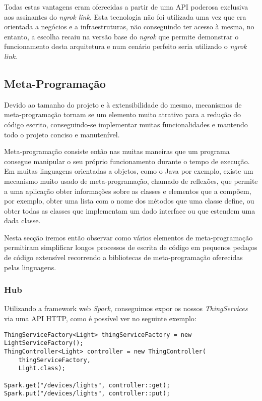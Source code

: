 Todas estas vantagens eram oferecidas a partir de uma API poderosa exclusiva aos assinantes do \textit{ngrok link}. Esta tecnologia não foi utilizada uma vez que era orientada a negócios e a infraestruturas, não conseguindo ter acesso à mesma, no entanto, a escolha recaiu na versão base do \textit{ngrok} que permite demonstrar o funcionamento desta arquitetura e num cenário perfeito seria utilizado o \textit{ngrok link}.

\subsection{Meta-Programação}

Devido ao tamanho do projeto e à extensibilidade do mesmo, mecanismos de meta-programação tornam se um elemento muito atrativo para a redução do código escrito, conseguindo-se implementar muitas funcionalidades e mantendo todo o projeto conciso e manutenível.

Meta-programação consiste então nas muitas maneiras que um programa consegue manipular o seu próprio funcionamento durante o tempo de execução. Em muitas linguagens orientadas a objetos, como o Java por exemplo, existe um mecanismo muito usado de meta-programação, chamado de reflexões, que permite a uma aplicação obter informações sobre as classes e elementos que a compõem, por exemplo, obter uma lista com o nome dos métodos que uma classe define, ou obter todas as classes que implementam um dado interface ou que estendem uma dada classe.

Nesta secção iremos então observar como vários elementos de meta-programação permitiram simplificar longos processos de escrita de código em pequenos pedaços de código extensível recorrendo a bibliotecas de meta-programação oferecidas pelas linguagens.

\subsubsection{Hub}

Utilizando a framework web \textit{Spark}, conseguimos expor os nossos \textit{ThingServices} via uma API HTTP, como é possível ver no seguinte exemplo:

\begin{verbatim}
ThingServiceFactory<Light> thingServiceFactory = new LightServiceFactory();
ThingController<Light> controller = new ThingController(
    thingServiceFactory,
    Light.class);

Spark.get("/devices/lights", controller::get);
Spark.put("/devices/lights", controller::put);
\end{verbatim}

